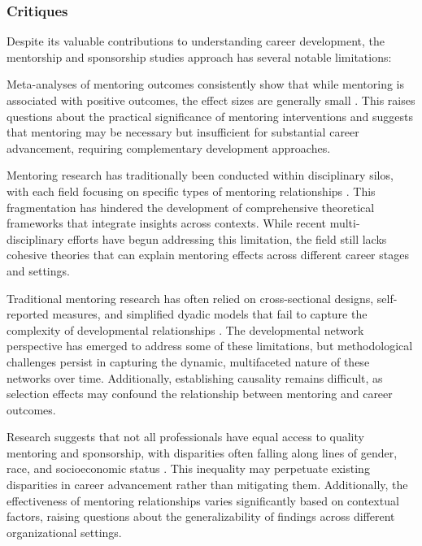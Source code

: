 \documentclass[main.tex]{subfiles}
\begin{document}
\subsubsection{Critiques}

Despite its valuable contributions to understanding career development, the mentorship and sponsorship studies approach has several notable limitations:

Meta-analyses of mentoring outcomes consistently show that while mentoring is associated with positive outcomes, the effect sizes are generally small \cite{dubois2011does}. This raises questions about the practical significance of mentoring interventions and suggests that mentoring may be necessary but insufficient for substantial career advancement, requiring complementary development approaches.

Mentoring research has traditionally been conducted within disciplinary silos, with each field focusing on specific types of mentoring relationships \cite{dubois2011does}. This fragmentation has hindered the development of comprehensive theoretical frameworks that integrate insights across contexts. While recent multi-disciplinary efforts have begun addressing this limitation, the field still lacks cohesive theories that can explain mentoring effects across different career stages and settings.

Traditional mentoring research has often relied on cross-sectional designs, self-reported measures, and simplified dyadic models that fail to capture the complexity of developmental relationships \cite{higgins2023celebrating, cdc2015network}. The developmental network perspective has emerged to address some of these limitations, but methodological challenges persist in capturing the dynamic, multifaceted nature of these networks over time. Additionally, establishing causality remains difficult, as selection effects may confound the relationship between mentoring and career outcomes.

Research suggests that not all professionals have equal access to quality mentoring and sponsorship, with disparities often falling along lines of gender, race, and socioeconomic status \cite{alachkar2023sponsor, rsna2021mentorship}. This inequality may perpetuate existing disparities in career advancement rather than mitigating them. Additionally, the effectiveness of mentoring relationships varies significantly based on contextual factors, raising questions about the generalizability of findings across different organizational settings.
\end{document}
